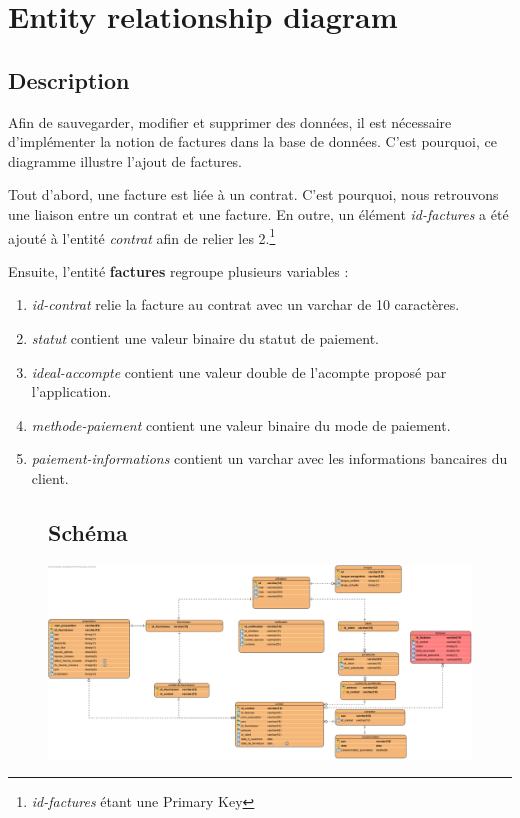 \section{Entity relationship diagram}
\subsection{Description}

\begin{flushleft}
Afin de sauvegarder, modifier et supprimer des données, il est nécessaire d'implémenter la notion de factures dans la base de données. C'est pourquoi, ce diagramme illustre l'ajout de factures.
\end{flushleft}

\begin{flushleft}
Tout d'abord, une facture est liée à un contrat. C'est pourquoi, nous retrouvons une liaison entre un contrat et une facture. En outre, un élément \emph{id-factures} a été ajouté à l'entité \emph{contrat} afin de relier les 2.\footnote{\emph{id-factures} étant une Primary Key}
\end{flushleft}

\begin{flushleft}
Ensuite, l'entité \textbf{factures} regroupe plusieurs variables : 
\end{flushleft}
\begin{enumerate}[-]

\item \emph{id-contrat} relie la facture au contrat avec un varchar de 10 caractères.

\item \emph{statut} contient une valeur binaire du statut de paiement.

\item \emph{ideal-accompte} contient une valeur double de l'acompte proposé par l'application.

\item \emph{methode-paiement} contient une valeur binaire du mode de paiement.

\item \emph{paiement-informations} contient un varchar avec les informations bancaires du client.

\end{enumerate}

\newpage
\begin{figure}[h]
\subsection{Schéma}
\centering
\includegraphics[width = 1.2\textwidth]{extension-maxime/bdd/img/bdd-extension.png}
\end{figure}
